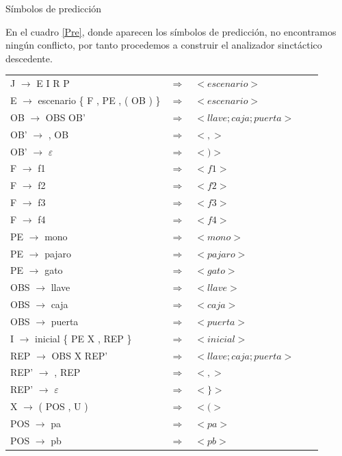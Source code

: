 \documentclass[11pt,a4paper,spanish,twoside]{book}
\makeatletter
\renewcommand{\section}{
  \@startsection{section}{1}{0mm}{\baselineskip}
  {2.5mm}{\Large\bf}
}
\theoremstyle{plain} \newtheorem{nota}{Nota}
\makeatother
\begin{document}
\section{Símbolos de predicción}

En el cuadro \ref{Pre}, donde aparecen los símbolos de predicción, no 
encontramos ningún conflicto, por tanto procedemos a construir el analizador 
sinctáctico descedente.
\begin{table}[!ht]
  \centering
  \begin{tabular}{lllll}
    \hline
    J $\to$ E I R P & $\Longrightarrow$ & $<escenario>$ \\
    E $\to$ escenario \{ F , PE , ( OB ) \} & $\Longrightarrow$ & $<escenario>$
    \\
    OB $\to$ OBS OB'& $\Longrightarrow$ & $<llave;caja;puerta>$ \\
    OB' $\to$ , OB & $\Longrightarrow$ & $<,>$ \\
    OB' $\to$ $\varepsilon$ & $\Longrightarrow$ & $<)>$ \\
    F $\to$ f1 & $\Longrightarrow$ & $<f1>$ \\
    F $\to$ f2 & $\Longrightarrow$ & $<f2>$ \\
    F $\to$ f3 & $\Longrightarrow$ & $<f3>$ \\
    F $\to$ f4 & $\Longrightarrow$ & $<f4>$ \\
    PE $\to$ mono & $\Longrightarrow$ & $<mono>$ \\
    PE $\to$ pajaro & $\Longrightarrow$ & $<pajaro>$ \\
    PE $\to$ gato & $\Longrightarrow$ & $<gato>$ \\
    OBS $\to$ llave & $\Longrightarrow$ & $<llave>$ \\
    OBS $\to$ caja & $\Longrightarrow$ & $<caja>$ \\
    OBS $\to$ puerta & $\Longrightarrow$ & $<puerta>$ \\
    I $\to$ inicial \{ PE X , REP \} & $\Longrightarrow$ & $<inicial>$ \\
    REP $\to$ OBS X REP' & $\Longrightarrow$ & $<llave;caja;puerta>$ \\
    REP' $\to$ , REP & $\Longrightarrow$ & $<,>$ \\
    REP' $\to$ $\varepsilon$ & $\Longrightarrow$ & $<\}>$ \\
    X $\to$ ( POS , U ) & $\Longrightarrow$ & $<(>$ \\
    POS $\to$ pa & $\Longrightarrow$ & $<pa>$ \\
    POS $\to$ pb & $\Longrightarrow$ & $<pb>$ \\

\end{tabular}
\end{table}
\end{document}
